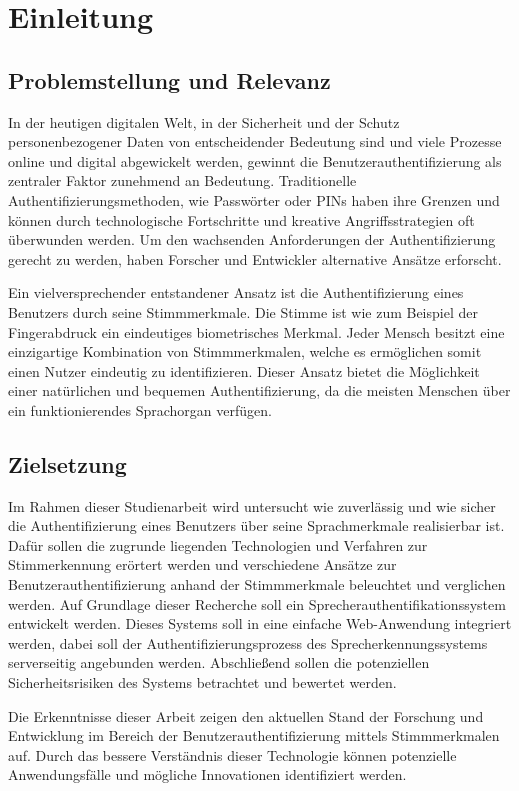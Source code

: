 \section{Einleitung}
\subsection{Problemstellung und Relevanz}
In der heutigen digitalen Welt, in der Sicherheit und der Schutz personenbezogener Daten von entscheidender Bedeutung sind und viele Prozesse online und digital abgewickelt werden, gewinnt die Benutzerauthentifizierung als zentraler Faktor zunehmend an Bedeutung.
Traditionelle Authentifizierungsmethoden, wie Passwörter oder PINs haben ihre Grenzen und können durch technologische Fortschritte und kreative Angriffsstrategien oft überwunden werden.
Um den wachsenden Anforderungen der Authentifizierung gerecht zu werden, haben Forscher und Entwickler alternative Ansätze erforscht.

Ein vielversprechender entstandener Ansatz ist die Authentifizierung eines Benutzers durch seine Stimmmerkmale.
Die Stimme ist wie zum Beispiel der Fingerabdruck ein eindeutiges biometrisches Merkmal.
Jeder Mensch besitzt eine einzigartige Kombination von Stimmmerkmalen, welche es ermöglichen somit einen Nutzer eindeutig zu identifizieren.
Dieser Ansatz bietet die Möglichkeit einer natürlichen und bequemen Authentifizierung, da die meisten Menschen über ein funktionierendes Sprachorgan verfügen.

\subsection{Zielsetzung}\label{sec:Zielsetzung}
Im Rahmen dieser Studienarbeit wird untersucht wie zuverlässig und wie sicher die Authentifizierung eines Benutzers über seine Sprachmerkmale realisierbar ist.
Dafür sollen die zugrunde liegenden Technologien und Verfahren zur Stimmerkennung erörtert werden und verschiedene Ansätze zur Benutzerauthentifizierung anhand der Stimmmerkmale beleuchtet und verglichen werden.
Auf Grundlage dieser Recherche soll ein Sprecherauthentifikationssystem entwickelt werden.
Dieses Systems soll in eine einfache Web-Anwendung integriert werden, dabei soll der Authentifizierungsprozess des Sprecherkennungssystems serverseitig angebunden werden.
Abschließend sollen die potenziellen Sicherheitsrisiken des Systems betrachtet und bewertet werden.

Die Erkenntnisse dieser Arbeit zeigen den aktuellen Stand der Forschung und Entwicklung im Bereich der Benutzerauthentifizierung mittels Stimmmerkmalen auf.
Durch das bessere Verständnis dieser Technologie können potenzielle Anwendungsfälle und mögliche Innovationen identifiziert werden.

